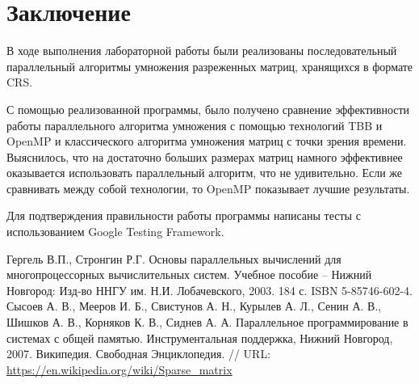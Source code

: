 \documentclass{report}
\begin{document}
\section* {Заключение}
В ходе выполнения лабораторной работы были реализованы последовательный параллельный алгоритмы умножения разреженных матриц, хранящихся в формате CRS.
\par
С помощью реализованной программы, было получено сравнение эффективности работы параллельного алгоритма умножения с помощью технологий TBB и OpenMP и классического алгоритма умножения матриц с точки зрения времени. Выяснилось, что на достаточно больших размерах матриц намного эффективнее оказывается использовать параллельный алгоритм, что не удивительно. Если же сравнивать между собой технологии, то OpenMP показывает лучшие результаты. 
\par Для подтверждения правильности работы программы написаны тесты с использованием Google Testing Framework.
\newpage
\begin{thebibliography}{1}
 Гергель В.П., Стронгин Р.Г. Основы параллельных вычислений для многопроцессорных вычислительных систем. Учебное пособие – Нижний Новгород: Изд-во ННГУ им. Н.И. Лобачевского, 2003. 184 с. ISBN 5-85746-602-4.
Сысоев А. В., Мееров И. Б., Свистунов А. Н., Курылев А. Л., Сенин А. В., Шишков А. В., Корняков К. В.,
Сиднев А. А. Параллельное программирование в системах с общей памятью. Инструментальная поддержка, Нижний Новгород, 2007.
 Википедия. Свободная Энциклопедия. // URL: \url{https://en.wikipedia.org/wiki/Sparse_matrix}
\end{thebibliography}
\newpage
\end{document}
